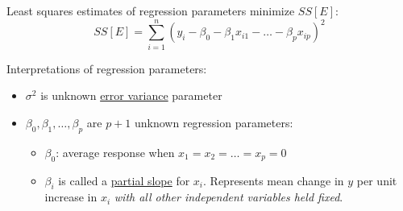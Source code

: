 Least squares estimates of regression parameters minimize $SS[E]$:
$$
SS[E] = \sum\limits_{i = 1}^n (y_i - \beta_0 -  \beta_1 x_{i1} - \dots -\beta_p x_{ip})^2
$$

\begin{center}
\end{center}
%
Interpretations of regression parameters:
\begin{itemize}
  \item $\sigma^2$ is unknown \underline{error variance} parameter
  \item $\beta_0, \beta_1, \dots, \beta_p$ are $p + 1$ unknown regression parameters:
    \begin{itemize}
      \item $\beta_0$: average response when $x_1 = x_2 = \dots = x_p = 0$
      \item $\beta_i$ is called a \underline{partial slope} for $x_i$.  Represents mean change in $y$ per unit increase in $x_i$ {\it with all other independent variables held fixed}.
    \end{itemize}
\end{itemize}


